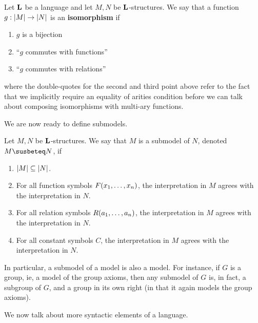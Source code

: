 \begin{boxdefinition}[Isomorphism]
    Let $\mathbf{L}$ be a language and let $M, N$ be $\mathbf{L}$-structures. We say that a function $g : \left\lvert M \right\rvert \to \left\lvert N \right\rvert$ is an \textbf{isomorphism} if
    \begin{enumerate}
        \item $g$ is a bijection
        \item ``$g$ commutes with functions''
        \item ``$g$ commutes with relations''
    \end{enumerate}
    where the double-quotes for the second and third point above refer to the fact that we implicitly require an equality of arities condition before we can talk about composing isomorphisms with multi-ary functions.
\end{boxdefinition}


We are now ready to define submodels.

\begin{boxdefinition}[Submodel]
    Let $M, N$ be $\mathbf{L}$-structures. We say that $M$ is a submodel of $N$, denoted $M \susbeteq N$, if
    \begin{enumerate}
        \item $\left\lvert M \right\rvert \subseteq \left\lvert N \right\rvert$.
        \item For all function symbols $F\!\left( x_1, \ldots, x_n \right)$, the interpretation in $M$ agrees with the interpretation in $N$.
        \item For all relation symbols $R\!\left( a_1, \ldots, a_n \right)$, the interpretation in $M$ agrees with the interpretation in $N$.
        \item For all constant symbols $C$, the interpretation in $M$ agrees with the interpretation in $N$.
    \end{enumerate}
\end{boxdefinition}

In particular, a submodel of a model is also a model. For instance, if $G$ is a group, ie, a model of the group axioms, then any submodel of $G$ is, in fact, a subgroup of $G$, and a group in its own right (in that it again models the group axioms).

We now talk about more syntactic elements of a language.

